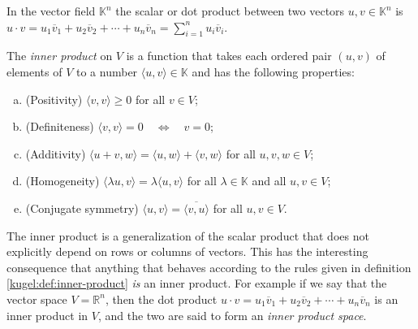 \begin{definition}
  \label{kugel:def:dot-product}
  In the vector field \(\mathbb{K}^n\) the scalar or dot product between two
  vectors \(u, v \in \mathbb{K}^n\) is
  \(
    u \cdot v 
    = u_1 \overline{v}_1 + u_2 \overline{v}_2 + \cdots + u_n \overline{v}_n
    = \sum_{i=1}^n u_i \overline{v}_i.
  \)
\end{definition}


\begin{definition}[Span]
\end{definition}


\begin{definition}
\end{definition}



\begin{definition}[Basis]
\end{definition}

\fi

\begin{definition}
  \label{kugel:def:inner-product} \nocite{axler_linear_2014}
  The \emph{inner product} on \(V\) is a function that takes each ordered pair
  \((u, v)\) of elements of \(V\) to a number \(\langle u, v \rangle \in
  \mathbb{K}\) and has the following properties:
  \begin{enumerate}[(a)]
    \item (Positivity) \(\langle v, v \rangle \geq 0\) for all \(v \in V\);
    \item (Definiteness) \(\langle v, v \rangle = 0 \quad \iff \quad v = 0\);
    \item (Additivity) \(
        \langle u + v, w \rangle =
        \langle u, w \rangle + \langle v, w \rangle
      \) for all \(u, v, w \in V\);
    \item (Homogeneity) \(
        \langle \lambda u, v \rangle =
        \lambda \langle u, v \rangle
      \) for all \(\lambda \in \mathbb{K}\) and all \(u, v \in V\);
    \item (Conjugate symmetry)
      \(\langle u, v \rangle = \overline{\langle v, u \rangle}\) for all
      \(u, v \in V\).
  \end{enumerate}
\end{definition}

The inner product is a generalization of the scalar product that does not
explicitly depend on rows or columns of vectors. This has the interesting
consequence that anything that behaves according to the rules given in
definition \ref{kugel:def:inner-product} \emph{is} an inner product. For
example if we say that the vector space \(V = \mathbb{R}^n\), then the dot
product
\(
  u \cdot v = u_1 \overline{v}_1
    + u_2 \overline{v}_2
    + \cdots + u_n \overline{v}_n
\)
is an inner product in \(V\), and the two are said to form an \emph{inner
product space}.

